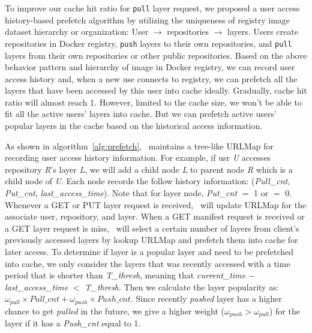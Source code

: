 To improve our cache hit ratio for \texttt{pull} layer request, we proposed a user access history-based prefetch algorithm
by utilizing the uniqueness of registry image dataset hierarchy or organization: User $\rightarrow$ repositories $\rightarrow$ layers.
Users create repositories in Docker registry, \texttt{push} layers to their own repositories,
and \texttt{pull} layers from their own repositories or other public repositories. 
Based on the above behavior pattern and hierarchy of image in Docker registry, 
we can record user access history and,
when a new use connects to registry, we can prefetch all the layers that have been accessed by this user
into cache ideally.
Gradually, cache hit ratio will almost reach 1.
However, limited to the cache size, we won't be able to fit all the active users' layers into cache.
But we can prefetch active users' popular layers in the cache based on the historical access information.


As shown in algorithm~\ref{alg:prefetch}, \sysname~maintains a tree-like URLMap for recording 
user access history information. For example, if usr \emph{U} accesses repository \emph{R}'s layer \emph{L},
we will add a child node \emph{L} to parent node \emph{R} which is a child node of \emph{U}.
Each node records the follow history information: (\emph{Pull\_cnt}, \emph{Put\_cnt}, \emph{last\_access\_time}). Note that for layer node, \emph{Put\_cnt} $=$ 1 or $=$ 0.
Whenever a GET or PUT layer request is received, \sysname~will update URLMap for the associate user, repository, and layer. 
When a GET manifest request is received or a GET layer request is miss,
\sysname~will select a certain number of layers from client's previously accessed layers by lookup URLMap
and prefetch them into cache for later access.
To determine if layer is a popular layer and need to be prefetched into cache,
we only consider the layers that was recently accessed with a time period 
that is shorter than \emph{T\_thresh}, meaning that
\emph{current\_time} $-$ \emph{last\_access\_time} $<$ \emph{T\_thresh}.
Then we calculate the layer popularity as: 
$\omega_{pull} \times Pull\_cnt + \omega_{push} \times Push\_cnt$.
Since recently \emph{pushed} layer has a higher chance to get \emph{pulled} in the future,
we give a higher weight ($\omega_{push} > \omega_{pull}$) for the layer if it has a \emph{Push\_cnt} equal to 1. 

 

